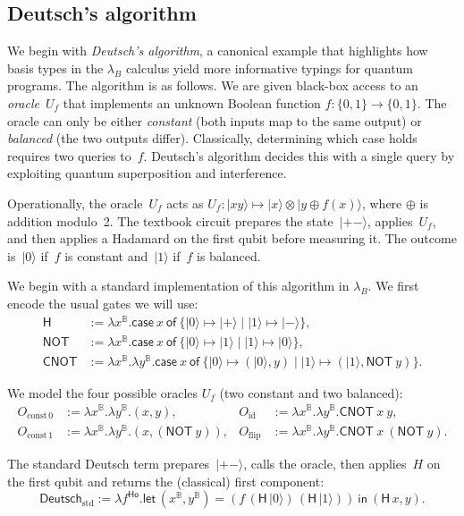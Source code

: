 \documentclass[runningheads,orivec,envcountsame,envcountsect]{llncs}
\newcommand\ket[1]{\ensuremath{|#1\rangle}}
\newcommand\AbsBasis{\ensuremath{\mathsf{Ho}}}
\def\Pair#1#2{(#1,#2)} %
\def\Lam#1#2#3{\lambda#1^{#2}{.}#3} %
\def\letkeyword{\mathsf{let}}
\def\inkeyword{\mathsf{in}}
\def\LetP#1#2#3#4#5#6{\letkeyword\,\Pair{#1^{#2}}{#3^{#4}}=#5~\inkeyword~#6}
\def\case#1#2#3#4#5{\ensuremath{\mathsf{case}~#1~\mathsf{of}~\{#2\mapsto #4 \mid #3\mapsto #5\}}}
\newcommand\B{\mathbb B}
\newcommand\Hd{\mathsf{H}}
\newcommand{\cnot}[2]{\mathsf{CNOT}\ #1\ #2}
\newcommand{\pauliX}[1]{\mathsf{NOT}\ #1}
\newcommand{\lambdaB}{\lambda_B}
\begin{document}
\subsection{Deutsch's algorithm}\label{subsec:deutsch}
We begin with \emph{Deutsch's algorithm}, a canonical example that highlights
how basis types in the $\lambdaB$ calculus yield more informative typings for
quantum programs.
The algorithm is as follows.
We are given black-box access to an \emph{oracle}~$U_f$ that implements an
unknown Boolean function $f:\{0,1\}\to\{0,1\}$.  
The oracle can only be either \emph{constant} (both inputs map to the same
output) or \emph{balanced} (the two outputs differ).  
Classically, determining which case holds requires two queries to~$f$.  
Deutsch's algorithm decides this with a single query by exploiting quantum
superposition and interference.

Operationally, the oracle~$U_f$ acts as
\(
  U_f:\ket{xy}\mapsto \ket{x}\otimes\ket{y\oplus f(x)}
\),
where $\oplus$ is addition modulo~2.  
The textbook circuit prepares the state~$\ket{+-}$, applies~$U_f$, and
then applies a Hadamard on the first qubit before measuring it.  
The outcome is~$\ket{0}$ if~$f$ is constant and~$\ket{1}$ if~$f$ is balanced.

We begin with a standard implementation of this algorithm in $\lambdaB$.
We first encode the usual gates we will use:
\begin{align*}
  \Hd &:= \Lam{x}{\B}{\case{x}{\ket{0}}{\ket{1}}{\ket{+}}{\ket{-}}},\\
  \mathsf{NOT} &:= \Lam{x}{\B}{\case{x}{\ket{0}}{\ket{1}}{\ket{1}}{\ket{0}}},\\
  \mathsf{CNOT} &:= \Lam{x}{\B}{\Lam{y}{\B}{
    \case{x}{\ket{0}}{\ket{1}}
      {\Pair{\ket{0}}{y}}
      {\Pair{\ket{1}}{\pauliX{y}}}}}.
\end{align*}

We model the four possible oracles $U_f$ (two constant and two balanced):
\begin{align*}
  O_{\mathrm{const}\,0} &:= \Lam{x}{\B}{\Lam{y}{\B}{\Pair{x}{y}}},
  & O_{\mathrm{id}}       &:= \Lam{x}{\B}{\Lam{y}{\B}{\cnot{x}{y}}},\\
  O_{\mathrm{const}\,1} &:= \Lam{x}{\B}{\Lam{y}{\B}{\Pair{x}{(\pauliX{y})}}},
  & O_{\mathrm{flip}}     &:= \Lam{x}{\B}{\Lam{y}{\B}{\cnot{x}{(\pauliX{y})}}}.
\end{align*}

The standard Deutsch term prepares~$\ket{+-}$, calls the oracle, then
applies~$H$ on the first qubit and returns the (classical) first component:
\[
  \mathsf{Deutsch}_{\mathrm{std}} :=
  \Lam{f}{\AbsBasis}{
    \LetP{x}{\B}{y}{\B}
      {(f\,(\Hd\,\ket{0})\,(\Hd\,\ket{1}))}
      {\Pair{\Hd\,x}{y}}
  }.
\]
\end{document}
